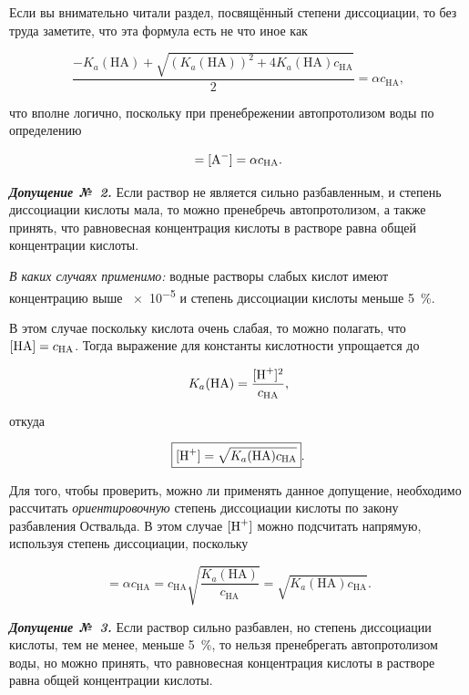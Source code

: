 Если вы внимательно читали раздел, посвящённый степени диссоциации, то без труда заметите, что эта формула есть не что иное как

\begin{equation*}
    \frac{-K_a(\text{HA}) + \sqrt{(K_a(\text{HA}))^2 + 4K_a(\text{HA})c_{\text{HA}}}}{2} = \alpha c_{\text{HA}},
\end{equation*}

что вполне логично, поскольку при пренебрежении автопротолизом воды по определению

\begin{equation*}
    [\ce{H^+}] = [\ce{A^-}] = \alpha c_{\text{HA}}.
\end{equation*}

\textbf{\textit{Допущение №~2.}} Если раствор не является сильно разбавленным, и степень диссоциации кислоты мала, то можно пренебречь автопротолизом, а также принять, что равновесная концентрация кислоты в растворе равна общей концентрации кислоты.

\textit{В каких случаях применимо:} водные растворы слабых кислот имеют концентрацию выше \qty{e-5}{\ruMolar} и степень диссоциации кислоты меньше \qty{5}{\percent}.

В этом случае поскольку кислота очень слабая, то можно полагать, что $[\ce{HA}] = c_{\text{HA}}$. Тогда выражение для константы кислотности упрощается до

\begin{equation*}
    K_a(\text{HA}) = \frac{[\ce{H^+}]^2}{c_{\text{HA}}},
\end{equation*}

откуда

\begin{equation}
    \label{eq:assumption_2}
    \boxed{[\ce{H^+}] = \sqrt{K_a(\text{HA})c_{\text{HA}}}}.
\end{equation}

Для того, чтобы проверить, можно ли применять данное допущение, необходимо рассчитать \emph{ориентировочную} степень диссоциации кислоты по закону разбавления Оствальда. В этом случае $[\ce{H^+}]$ можно подсчитать напрямую, используя степень диссоциации, поскольку

\begin{equation*}
    [\ce{H^+}]
    = \alpha c_{\text{HA}}
    = c_{\text{HA}}\sqrt{\dfrac{K_a(\text{HA})}{c_{\text{HA}}}}
    = \sqrt{K_a(\text{HA})c_{\text{HA}}}.
\end{equation*}

\textbf{\textit{Допущение №~3.}} Если раствор сильно разбавлен, но степень диссоциации кислоты, тем не менее, меньше \qty{5}{\percent}, то нельзя пренебрегать автопротолизом воды, но можно принять, что равновесная концентрация кислоты в растворе равна общей концентрации кислоты.

